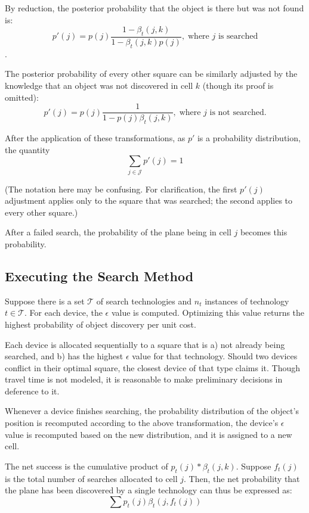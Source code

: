 \documentclass[a4paper]{article}
\begin{document}
By reduction, the posterior probability that the object is there but was not found is: $$p'(j)=p(j)\frac{1-\beta_t(j,k)}{1-\beta_t(j,k)p(j)},\;\mbox{where }j\mbox{ is searched}$$.

The posterior probability of every other square can be similarly adjusted by the knowledge that an object was not discovered in cell $k$ (though its proof is omitted): $$p'(j)=p(j)\frac{1}{1-p(j)\beta_t(j,k)},\;\mbox{where }j\mbox{ is not searched.}$$

After the application of these transformations, as $p'$ is a probability distribution, the quantity $$\sum_{j\in\mathcal{J}}p'(j) = 1$$

(The notation here may be confusing. For clarification, the first $p'(j)$ adjustment applies only to the square that was searched; the second applies to every other square.)

After a failed search, the probability of the plane being in cell $j$ becomes this probability.

\subsection{Executing the Search Method}

Suppose there is a set $\mathcal{T}$ of search technologies and $n_t$ instances of technology $t\in\mathcal{T}$. For each device, the $\epsilon$ value is computed. Optimizing this value returns the highest probability of object discovery per unit cost.

Each device is allocated sequentially to a square that is a) not already being searched, and b) has the highest $\epsilon$ value for that technology. Should two devices conflict in their optimal square, the closest device of that type claims it. Though travel time is not modeled, it is reasonable to make preliminary decisions in deference to it.

Whenever a device finishes searching, the probability distribution of the object's position is recomputed according to the above transformation, the device's $\epsilon$ value is recomputed based on the new distribution, and it is assigned to a new cell.

The net success is the cumulative product of $p_t(j)*\beta_t(j,k)$. Suppose $f_t(j)$ is the total number of searches allocated to cell $j$. Then, the net probability that the plane has been discovered by a single technology can thus be expressed as: $$\sum p_t(j)\beta_t(j,f_t(j))$$


\end{document}
